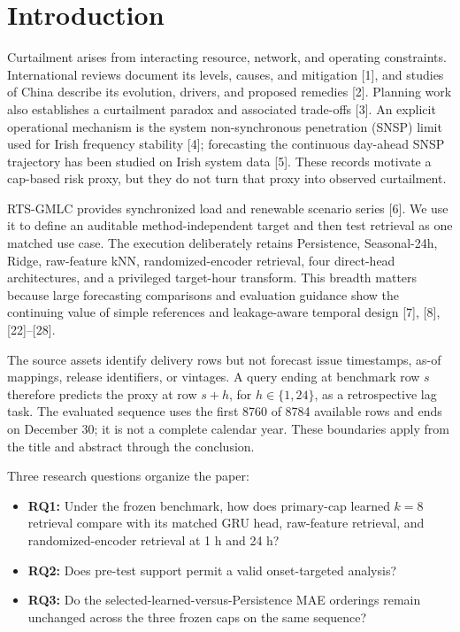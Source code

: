 \documentclass{ieeeaccess}
\providecommand{\tightlist}{\setlength{\itemsep}{0pt}\setlength{\parskip}{0pt}}
\begin{document}
\section{Introduction}\label{introduction}

Curtailment arises from interacting resource, network, and operating constraints. International reviews document its levels, causes, and mitigation {[}1{]}, and studies of China describe its evolution, drivers, and proposed remedies {[}2{]}. Planning work also establishes a curtailment paradox and associated trade-offs {[}3{]}. An explicit operational mechanism is the system non-synchronous penetration (SNSP) limit used for Irish frequency stability {[}4{]}; forecasting the continuous day-ahead SNSP trajectory has been studied on Irish system data {[}5{]}. These records motivate a cap-based risk proxy, but they do not turn that proxy into observed curtailment.

RTS-GMLC provides synchronized load and renewable scenario series {[}6{]}. We use it to define an auditable method-independent target and then test retrieval as one matched use case. The execution deliberately retains Persistence, Seasonal-24h, Ridge, raw-feature kNN, randomized-encoder retrieval, four direct-head architectures, and a privileged target-hour transform. This breadth matters because large forecasting comparisons and evaluation guidance show the continuing value of simple references and leakage-aware temporal design {[}7{]}, {[}8{]}, {[}22{]}--{[}28{]}.

The source assets identify delivery rows but not forecast issue timestamps, as-of mappings, release identifiers, or vintages. A query ending at benchmark row \(s\) therefore predicts the proxy at row \(s+h\), for \(h\in\{1,24\}\), as a retrospective lag task. The evaluated sequence uses the first 8760 of 8784 available rows and ends on December 30; it is not a complete calendar year. These boundaries apply from the title and abstract through the conclusion.

Three research questions organize the paper:

\begin{itemize}
\tightlist
\item
  \textbf{RQ1:} Under the frozen benchmark, how does primary-cap learned \(k=8\) retrieval compare with its matched GRU head, raw-feature retrieval, and randomized-encoder retrieval at 1 h and 24 h?
\item
  \textbf{RQ2:} Does pre-test support permit a valid onset-targeted analysis?
\item
  \textbf{RQ3:} Do the selected-learned-versus-Persistence MAE orderings remain unchanged across the three frozen caps on the same sequence?
\end{itemize}
\end{document}
